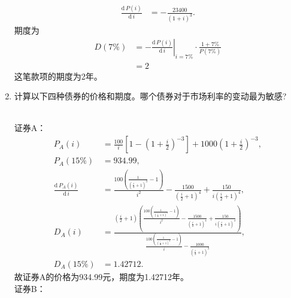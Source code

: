 \begin{enumerate}
\begin{align*}
        \frac{\mathrm{d}\, P(i)}{\mathrm{d} \, i} & = -\frac{23400}{(1 + i)^3}.
    \end{align*}
    期度为
    \begin{align*}
        D(7\%) & = \left.-\frac{\mathrm{d}\, P(i)}{\mathrm{d} \, i}\right| _{i = 7\%} \cdot \frac{1 + 7\%}{P(7\%)} \\
        & = 2
    \end{align*}
    这笔款项的期度为2年。
    \item 计算以下四种债券的价格和期度。哪个债券对于市场利率的变动最为敏感?
    \begin{center}
    \end{center}
    \sol\\
    证券A：
    \begin{align*}
        P_A(i) & = \frac{100}{i} \left[1 - \left(1 + \frac{i}{2}\right)^{-3}\right] + 1000\left(1 + \frac{i}{2}\right)^{-3},\\
        P_A(15\%) & = 934.99,\\
        \frac{\mathrm{d}\, P_A(i)}{\mathrm{d} \, i} & = \frac{100 \left(\frac{1}{{\left(\frac{i}{2} + 1\right)}^3} - 1\right)}{i^2} - \frac{1500}{{\left(\frac{i}{2} + 1\right)}^4} + \frac{150}{i {\left(\frac{i}{2} + 1\right)}^4},\\
        D_A(i) & = \frac{\left(\frac{i}{2} + 1\right) \left(\frac{100 \left(\frac{1}{{\left(\frac{i}{2} + 1\right)}^3} - 1\right)}{i^2} - \frac{1500}{{\left(\frac{i}{2} + 1\right)}^4} + \frac{150}{i {\left(\frac{i}{2} + 1\right)}^4}\right)}{\frac{100 \left(\frac{1}{{\left(\frac{i}{2} + 1\right)}^3} - 1\right)}{i} - \frac{1000}{{\left(\frac{i}{2} + 1\right)}^3}},\\
        D_A(15\%) & = 1.42712.
    \end{align*}
    故证券A的价格为934.99元，期度为1.42712年。\\
    证券B：
    \begin{align*}

\end{align*}
\end{enumerate}
